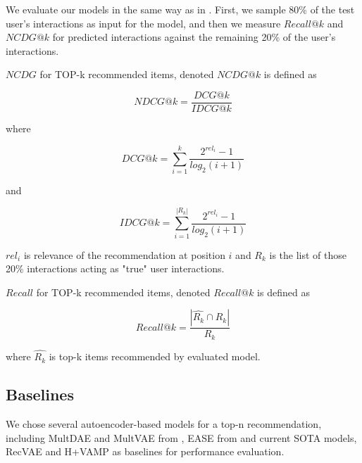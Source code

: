 \documentclass[conference]{IEEEtran}
\begin{document}
        We evaluate our models in the same way as in \cite{Liang2018}. First, we sample 80\% of the test user's interactions as input for the model, and then we measure \(Recall@k\) and \(NCDG@k\) for predicted interactions against the remaining 20\% of the user's interactions. 
        
        \(NCDG\) for TOP-k recommended items, denoted \(NCDG@k\) is defined as 
        
        \begin{equation}\label{ndcg} 
            NDCG@k = \frac{DCG@k}{IDCG@k}
        \end{equation}
        
        where 
        
        \begin{equation}\label{dcg} 
            DCG@k = \sum_{i=1}^{k} \frac{2^{rel_{i}}-1}{log_2(i+1)}
        \end{equation}
        
        and     
        
        \begin{equation}\label{idcg} 
            IDCG@k = \sum_{i=1}^{|R_k|} \frac{2^{rel_{i}}-1}{log_2(i+1)}
        \end{equation}
        
        \(rel_{i}\) is relevance of the recommendation at position \(i\) and \(R_k\) is the list of those 20\% interactions acting as "true" user interactions.
        
        \(Recall\) for TOP-k recommended items, denoted \(Recall@k\) is defined as
        
        \begin{equation}\label{recall} 
            Recall@k = \frac{|\hat{R_k} \cap R_k|}{R_k}
        \end{equation}
        
        where \(\hat{R_k}\) is top-k items recommended by evaluated model.
        
    \subsection{Baselines}
        
        We chose several autoencoder-based models for a top-n recommendation, including MultDAE and MultVAE from \cite{Liang2018}, EASE from \cite{Steck2019} and current SOTA models, RecVAE \cite{Shenbin2020} and H+VAMP \cite{Kim2019} as baselines for performance evaluation.
        
\end{document}
